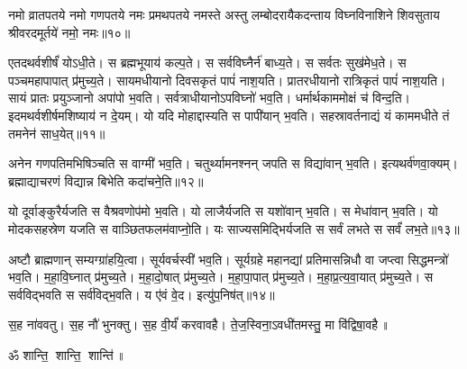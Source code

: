 नमो व्रातपतये नमो गणपतये नमः प्रमथपतये नमस्ते अस्तु लम्बोदरायैकदन्ताय विघ्नविनाशिने शिवसुताय श्रीवरदमू‍र्तये॑ नमो॒ नमः॥१०॥

एतदथर्वशीर्षं॑ योऽधी॒ते। स ब्रह्मभूयाय॑ कल्प॒ते।  स सर्वविघ्नैर्न॑ बाध्य॒ते।
स सर्वतः सुख॑मेध॒ते।  स पञ्चमहापापात् प्र॑मुच्य॒ते।
सायमधीयानो दिवसकृतं पापं॑ नाश॒यति।  प्रातरधीयानो रात्रिकृतं पापं॑ नाश॒यति।
सायं प्रातः प्रयुञ्जानो अपा॑पो भ॒वति।  सर्वत्राधीयानोऽपविघ्नो॑ भव॒ति।
धर्मार्थकाममोक्षं च॑ विन्द॒ति। इदमथर्वशीर्षमशिष्याय॑ न दे॒यम्।  यो यदि मोहाद्दास्यति स पापी॑यान् भ॒वति।
सहस्रावर्तनाद्यं यं काममधीते तं तमनेन॑ साध॒येत्॥११॥

अनेन गणपतिमभिषिञ्चति स वाग्मी॑ भव॒ति।  चतुर्थ्यामनश्नन् जपति स विद्या॑वान् भ॒वति।  इत्यथर्व॑णवा॒क्यम्। ब्रह्माद्याचरणं विद्यान्न बिभेति कदा॑चने॒ति॥१२॥

यो दूर्वाङ्कुरैर्यजति स वैश्रवणोप॑मो भ॒वति। यो लाजैर्यजति स यशो॑वान् भ॒वति। स मेधा॑वान् भ॒वति। 
यो मोदकसहस्रेण यजति स वाञ्छितफलम॑वाप्नो॒ति। यः साज्यसमिद्भिर्यजति स सर्वं लभते स सर्वं॑ लभ॒ते॥१३॥

अष्टौ ब्राह्मणान् सम्यग्ग्रा॑हयि॒त्वा। सूर्यवर्चस्वी॑ भव॒ति।
सूर्यग्रहे महानद्यां प्रतिमासन्निधौ वा जप्त्वा सिद्धमन्त्रो॑ भव॒ति।
म॒हा॒वि॒घ्नात् प्र॑मुच्य॒ते।  म॒हा॒दो॒षात् प्र॑मुच्य॒ते। म॒हा॒पा॒पात् प्र॑मुच्य॒ते।
म॒हा॒प्र॒त्य॒वा॒यात् प्र॑मुच्य॒ते। स सर्वविद्भवति स सर्व॑विद्भ॒वति।\linebreak
य ए॑वं वे॒द।  इत्यु॑प॒निष॑त्॥१४॥

स॒ह ना॑ववतु। स॒ह नौ॑ भुनक्तु। स॒ह वी॒र्यं॑ करवावहै।
ते॒ज॒स्विना॒ऽवधी॑तमस्तु॒ मा वि॑द्विषा॒वहै॥

\centerline{ॐ शान्ति॒ शान्ति॒ शान्ति॑॥}
